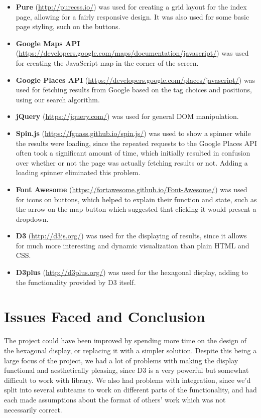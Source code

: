 \documentclass[10pt,a4paper]{article}
\begin{document}
\begin{itemize}
	\item \textbf{Pure} (\url{http://purecss.io/}) was used for creating a grid layout for the index page, allowing for a fairly responsive design. It was also used for some basic page styling, such on the buttons.
	\item \textbf{Google Maps API} (\url{https://developers.google.com/maps/documentation/javascript/}) was used for creating the JavaScript map in the corner of the screen.
	\item \textbf{Google Places API} (\url{https://developers.google.com/places/javascript/}) was used for fetching results from Google based on the tag choices and positions, using our search algorithm.
	\item \textbf{jQuery} (\url{https://jquery.com/}) was used for general DOM manipulation.
	\item \textbf{Spin.js} (\url{https://fgnass.github.io/spin.js/}) was used to show a spinner while the results were loading, since the repeated requests to the Google Places API often took a significant amount of time, which initially resulted in confusion over whether or not the page was actually fetching results or not. Adding a loading spinner eliminated this problem.
	\item \textbf{Font Awesome} (\url{https://fortawesome.github.io/Font-Awesome/}) was used for icons on buttons, which helped to explain their function and state, such as the arrow on the map button which suggested that clicking it would present a dropdown.
	\item \textbf{D3} (\url{http://d3js.org/}) was used for the displaying of results, since it allows for much more interesting and dynamic visualization than plain HTML and CSS.
	\item \textbf{D3plus} (\url{http://d3plus.org/}) was used for the hexagonal display, adding to the functionality provided by D3 itself.
\end{itemize}

\section*{Issues Faced and Conclusion}

The project could have been improved by spending more time on the design of the hexagonal display, or replacing it with a simpler solution. Despite this being a large focus of the project, we had a lot of problems with making the display functional and aesthetically pleasing, since D3 is a very powerful but somewhat difficult to work with library. We also had problems with integration, since we’d split into several subteams to work on different parts of the functionality, and had each made assumptions about the format of others’ work which was not necessarily correct.
\end{document}
